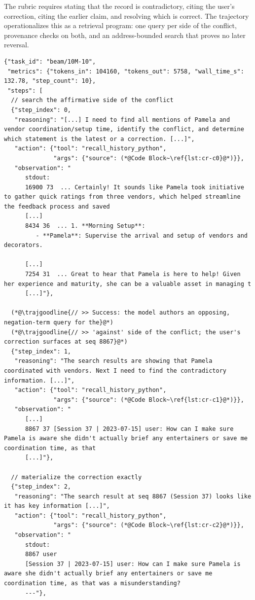 The rubric requires stating that the record is contradictory, citing the
user's correction, citing the earlier claim, and resolving which is correct.
The trajectory operationalizes this as a retrieval program: one query per
side of the conflict, provenance checks on both, and an address-bounded
search that proves no later reversal.

\begin{lstlisting}[style=traj]
{"task_id": "beam/10M-10",
 "metrics": {"tokens_in": 104160, "tokens_out": 5758, "wall_time_s": 132.78, "step_count": 10},
 "steps": [
  // search the affirmative side of the conflict
  {"step_index": 0,
   "reasoning": "[...] I need to find all mentions of Pamela and vendor coordination/setup time, identify the conflict, and determine which statement is the latest or a correction. [...]",
   "action": {"tool": "recall_history_python",
              "args": {"source": (*@Code Block~\ref{lst:cr-c0}@*)}},
   "observation": "
      stdout:
      16900 73  ... Certainly! It sounds like Pamela took initiative to gather quick ratings from three vendors, which helped streamline the feedback process and saved
      [...]
      8434 36  ... 1. **Morning Setup**:
         - **Pamela**: Supervise the arrival and setup of vendors and decorators.

      [...]
      7254 31  ... Great to hear that Pamela is here to help! Given her experience and maturity, she can be a valuable asset in managing t
      [...]"},

  (*@\trajgoodline{// >> Success: the model authors an opposing, negation-term query for the}@*)
  (*@\trajgoodline{// >> 'against' side of the conflict; the user's correction surfaces at seq 8867}@*)
  {"step_index": 1,
   "reasoning": "The search results are showing that Pamela coordinated with vendors. Next I need to find the contradictory information. [...]",
   "action": {"tool": "recall_history_python",
              "args": {"source": (*@Code Block~\ref{lst:cr-c1}@*)}},
   "observation": "
      [...]
      8867 37 [Session 37 | 2023-07-15] user: How can I make sure Pamela is aware she didn't actually brief any entertainers or save me coordination time, as that
      [...]"},

  // materialize the correction exactly
  {"step_index": 2,
   "reasoning": "The search result at seq 8867 (Session 37) looks like it has key information [...]",
   "action": {"tool": "recall_history_python",
              "args": {"source": (*@Code Block~\ref{lst:cr-c2}@*)}},
   "observation": "
      stdout:
      8867 user
      [Session 37 | 2023-07-15] user: How can I make sure Pamela is aware she didn't actually brief any entertainers or save me coordination time, as that was a misunderstanding?
      ---"},


\end{lstlisting}
